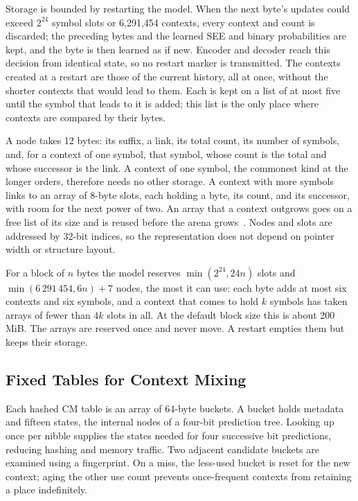 \documentclass[10pt,letterpaper]{article}
\begin{document}
Storage is bounded by restarting the model. When the next byte's updates could exceed $2^{24}$ symbol slots or 6,291,454 contexts, every context and count is discarded; the preceding bytes and the learned SEE and binary probabilities are kept, and the byte is then learned as if new. Encoder and decoder reach this decision from identical state, so no restart marker is transmitted. The contexts created at a restart are those of the current history, all at once, without the shorter contexts that would lead to them. Each is kept on a list of at most five until the symbol that leads to it is added; this list is the only place where contexts are compared by their bytes.

A node takes 12 bytes: its suffix, a link, its total count, its number of symbols, and, for a context of one symbol, that symbol, whose count is the total and whose successor is the link. A context of one symbol, the commonest kind at the longer orders, therefore needs no other storage. A context with more symbols links to an array of 8-byte slots, each holding a byte, its count, and its successor, with room for the next power of two. An array that a context outgrows goes on a free list of its size and is reused before the arena grows~\cite[Sec.~2.5]{knuth1}. Nodes and slots are addressed by 32-bit indices, so the representation does not depend on pointer width or structure layout.

For a block of $n$ bytes the model reserves $\min(2^{24},24n)$ slots and $\min(6\,291\,454,6n)+7$ nodes, the most it can use: each byte adds at most six contexts and six symbols, and a context that comes to hold $k$ symbols has taken arrays of fewer than $4k$ slots in all. At the default block size this is about 200 MiB. The arrays are reserved once and never move. A restart empties them but keeps their storage.

\subsection{Fixed Tables for Context Mixing}
Each hashed CM table is an array of 64-byte buckets. A bucket holds metadata and fifteen states, the internal nodes of a four-bit prediction tree. Looking up once per nibble supplies the states needed for four successive bit predictions, reducing hashing and memory traffic. Two adjacent candidate buckets are examined using a fingerprint. On a miss, the less-used bucket is reset for the new context; aging the other use count prevents once-frequent contexts from retaining a place indefinitely.
\end{document}
